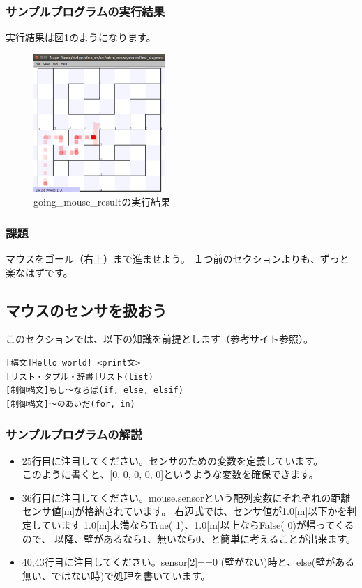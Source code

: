 \documentclass[11pt,a4paper]{jsarticle}
\begin{document}
\subsubsection{サンプルプログラムの実行結果}
実行結果は図\ref{going_mouse_result}のようになります。
\begin{figure}[h]
  \begin{center}
    \includegraphics[width=50mm]{./going_mouse_result.png}
  \end{center}
  \label{going_mouse_result}
  \caption{going\_mouse\_resultの実行結果}
\end{figure}

\subsubsection{課題}
マウスをゴール（右上）まで進ませよう。
１つ前のセクションよりも、ずっと楽なはずです。


\newpage
\subsection{マウスのセンサを扱おう}
このセクションでは、以下の知識を前提とします（参考サイト参照）。
\begin{lstlisting}[frame=single]
[構文]Hello world! <print文>
[リスト・タプル・辞書]リスト(list)
[制御構文]もし～ならば(if, else, elsif)
[制御構文]～のあいだ(for, in)
\end{lstlisting}

\subsubsection{サンプルプログラムの解説}
\begin{itemize}
\item{}
25行目に注目してください。センサのための変数を定義しています。\\
このように書くと、[0, 0, 0, 0, 0]というような変数を確保できます。
\item{}
36行目に注目してください。mouse.sensorという配列変数にそれぞれの距離センサ値[m]が格納されています。
右辺式では、センサ値が1.0[m]以下かを判定しています
1.0[m]未満ならTrue( 1)、1.0[m]以上ならFalse( 0)が帰ってくるので、
以降、壁があるなら1、無いなら0、と簡単に考えることが出来ます。
\item{}
40,43行目に注目してください。sensor[2]==0 (壁がない)時と、else(壁がある無い、ではない時)で処理を書いています。
\end{itemize}
\end{document}
